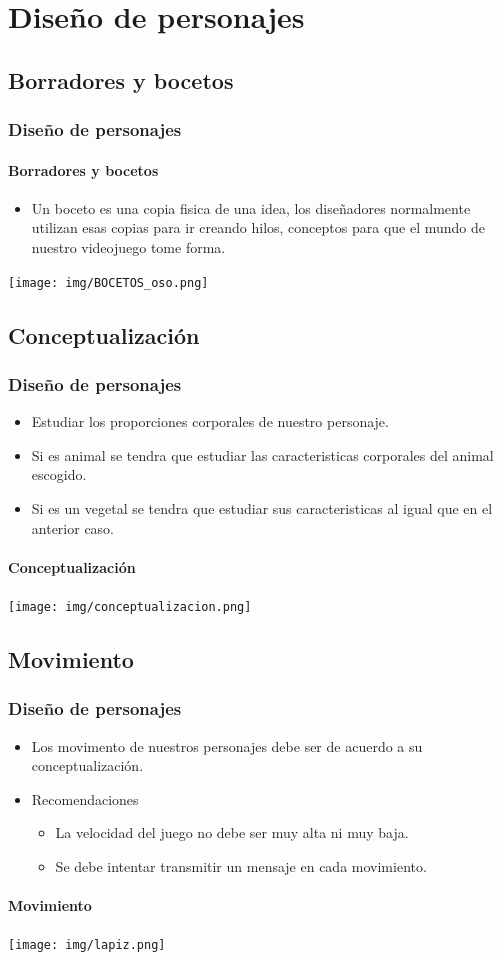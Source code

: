 \documentclass[11pt]{beamer}
\begin{document}
\section{Diseño de personajes}
\subsection{Borradores y bocetos}
\begin{frame}
\frametitle{Diseño de personajes}
\framesubtitle{Borradores y bocetos}
\begin{itemize}
\item Un boceto es una copia fisica de una idea, los diseñadores normalmente  utilizan esas copias para ir creando hilos, conceptos para que el mundo de nuestro videojuego tome forma.
\end{itemize}
\begin{center}
 \texttt{[image: img/BOCETOS\_oso.png]}
\end{center}
\end{frame}

\subsection{Conceptualización}
\begin{frame}
\frametitle{Diseño de personajes}
\begin{itemize}
\item Estudiar los proporciones corporales de nuestro personaje.
\item Si es animal se tendra que estudiar las caracteristicas corporales del animal escogido.
\item Si es un vegetal se tendra que estudiar sus caracteristicas al igual que en el anterior caso.
\end{itemize}
\framesubtitle{Conceptualización}
\begin{center}
 \texttt{[image: img/conceptualizacion.png]}
\end{center}
\end{frame}

\subsection{Movimiento}
\begin{frame}
\frametitle{Diseño de personajes}
\begin{itemize}
\item Los movimento de nuestros personajes debe ser de acuerdo a su conceptualización.
\item Recomendaciones
	\begin{itemize}
	\item 	La velocidad del juego no debe ser muy alta ni muy baja.
	\item 	Se debe intentar transmitir un mensaje en cada movimiento.
	
	\end{itemize}
\end{itemize}
\framesubtitle{Movimiento}
\begin{center}
 \texttt{[image: img/lapiz.png]}
\end{center}
\end{frame}
\end{document}
